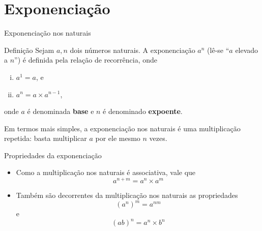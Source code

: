\section*{Exponenciação}

\begin{frame}[fragile]{Exponenciação nos naturais}

    \begin{block}{Definição}
        Sejam $a, n$ dois números naturais. A exponenciação $a^n$ (lê-se ``$a$ elevado a $n$'') é definida pela relação de recorrência, onde 
        \begin{enumerate}[(i)]
            \item $a^1 = a$, e
            \item $a^n = a \times a^{n - 1}$,
        \end{enumerate}

        onde $a$ é denominada \textbf{base} e $n$ é denominado \textbf{expoente}.
    \end{block}

    \vspace{0.2in}

    Em termos mais simples, a exponenciação nos naturais é uma multiplicação repetida: basta multiplicar $a$ por ele mesmo $n$ vezes. 

\end{frame}

\begin{frame}[fragile]{Propriedades da exponenciação}

    \begin{itemize}
        \item Como a multiplicação nos naturais é associativa, vale que
$$
a^{n + m} = a^{n} \times a^{m}
$$

        \item Também são decorrentes da multiplicação nos naturais as propriedades
$$
(a^{n})^{m} = a^{nm}
$$
e
$$
(ab)^n = a^n \times b^n
$$
    \end{itemize}

\end{frame}

